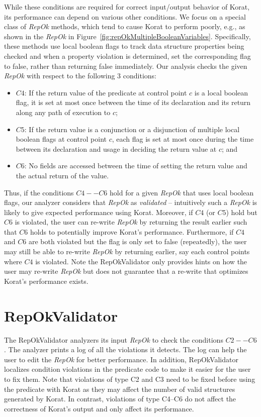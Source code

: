 While these conditions are required for correct input/output behavior
of Korat, its performance can depend on various other conditions.  We
focus on a special class of \emph{RepOk} methods, which tend to cause
Korat to perform poorly, e.g., as shown in the \emph{RepOk} in
Figure~\ref{fig:repOkMultipleBooleanVariables}.  Specifically, these
methods use local boolean flags to track data structure properties
being checked and when a property violation is determined, set the
corresponding flag to false, rather than returning false immediately.
Our analysis checks the given \emph{RepOk} with respect to the
following 3 conditions:

\begin{itemize}
\item $C4$: If the return value of the predicate at control point $c$ is
  a local boolean flag, it is set at most once between the time of its
  declaration and its return along any path of execution to $c$;
\item $C5$: If the return value is a conjunction or a disjunction of
  multiple local boolean flags at control point $c$, each flag is set
  at most once during the time between its declaration and usage in
  deciding the return value at $c$; and
\item $C6$: No fields are accessed between the time of setting the
  return value and the actual return of the value.
\end{itemize}

Thus, if the conditions $C4--C6$ hold for a given \emph{RepOk} that uses
local boolean flags, our analyzer considers that \emph{RepOk} as
\emph{validated} -- intuitively such a \emph{RepOk} is likely to give
expected performance using Korat.  Moreover, if $C4$ (or $C5$) hold
but $C6$ is violated, the user can re-write \emph{RepOk} by returning the
result earlier such that $C6$ holds to potentially improve Korat's
performance.  Furthermore, if $C4$ and $C6$ are both violated but the
flag is only set to false (repeatedly), the user may still be able to
re-write \emph{RepOk} by returning earlier, say each control points where
$C4$ is violated.  Note the RepOkValidator only provides hints on how
the user may re-write \emph{RepOk} but does not guarantee that a re-write
that optimizes Korat's performance exists.

\section{RepOkValidator}
\label{sec:repokvalidator}
The RepOkValidator analyzers its input \emph{RepOk} to check the conditions
$C2--C6$.  The analyzer prints a log of all the violations it detects.
The log can help the user to edit the \emph{RepOk} for better performance.
In addition, RepOkValidator localizes condition violations in the
predicate code to make it easier for the user to fix them.  Note that
violations of type C2 and C3 need to be fixed before using the
predicate with Korat as they may affect the number of valid structures
generated by Korat. In contrast, violations of type C4--C6 do not
affect the correctness of Korat's output and only affect its
performance.

